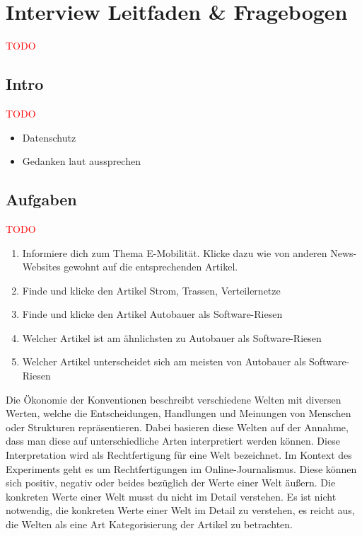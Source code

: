 \section{Interview Leitfaden \& Fragebogen}
\textcolor{red}{TODO}

\subsection{Intro}
\textcolor{red}{TODO}
\begin{itemize}
    \item Datenschutz
    \item Gedanken laut aussprechen
\end{itemize}

\subsection{Aufgaben}
\textcolor{red}{TODO}
\begin{enumerate}
    \item Informiere dich zum Thema E-Mobilität. Klicke dazu wie von anderen News-Websites gewohnt auf die entsprechenden Artikel.
    \item Finde und klicke den Artikel \glqq Strom, Trassen, Verteilernetze\grqq{}
    \item Finde und klicke den Artikel \glqq Autobauer als Software-Riesen\grqq{}
    \item Welcher Artikel ist am ähnlichsten zu \glqq Autobauer als Software-Riesen\grqq{}
    \item Welcher Artikel unterscheidet sich am meisten von \glqq Autobauer als Software-Riesen\grqq{}
\end{enumerate}

Die Ökonomie der Konventionen beschreibt verschiedene Welten mit diversen Werten, welche die Entscheidungen, Handlungen und Meinungen von Menschen oder Strukturen repräsentieren.
Dabei basieren diese Welten auf der Annahme, dass man diese auf unterschiedliche Arten interpretiert werden können.
Diese Interpretation wird als Rechtfertigung für eine Welt bezeichnet.
Im Kontext des Experiments geht es um Rechtfertigungen im Online-Journalismus.
Diese können sich positiv, negativ oder beides bezüglich der Werte einer Welt äußern.
Die konkreten Werte einer Welt musst du nicht im Detail verstehen.
Es ist nicht notwendig, die konkreten Werte einer Welt im Detail zu verstehen, es reicht aus, die Welten als eine Art Kategorisierung der Artikel zu betrachten.

